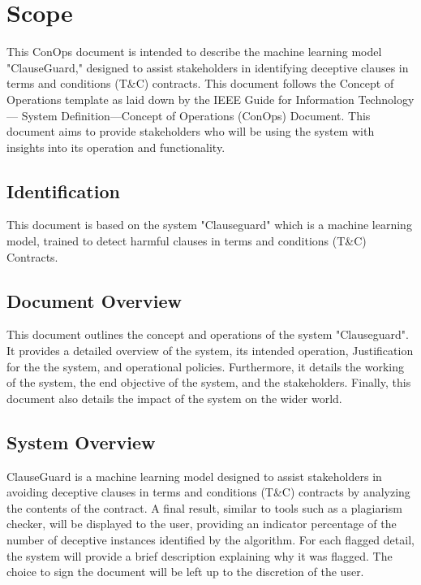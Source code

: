 \chapter{Scope \\
\label{Chapter::Scope}}
This ConOps document is intended to describe the machine learning model "ClauseGuard," designed to assist stakeholders in identifying deceptive clauses in terms and conditions (T\&C) contracts. This document follows the Concept of Operations template as laid down by the IEEE Guide for Information Technology—
System Definition—Concept of
Operations (ConOps) Document. This document aims to provide stakeholders who will be using the system with insights into its operation and functionality. 


\section{Identification\label{Section::Project Identification} }
This document is based on the system "Clauseguard" which is a machine learning model, trained to detect harmful clauses in terms and conditions (T\&C) Contracts.



\section { Document Overview \label{Section::Document Overview} }
This document outlines the concept and operations of the system "Clauseguard". It provides a detailed overview of the system, its intended operation, Justification for the the system, and operational policies. Furthermore, it details the working of the system, the end objective of the system, and the stakeholders. Finally, this document also details the impact of the system on the wider world. 


\section{System Overview\label{Section::System Overview}}

ClauseGuard is a machine learning model designed to assist stakeholders in avoiding deceptive clauses in terms and conditions (T\&C) contracts by analyzing the contents of the contract. A final result, similar to tools such as a plagiarism checker, will be displayed to the user, providing an indicator percentage of the number of deceptive instances identified by the algorithm. For each flagged detail, the system will provide a brief description explaining why it was flagged. The choice to sign the document will be left up to the discretion of the user.


